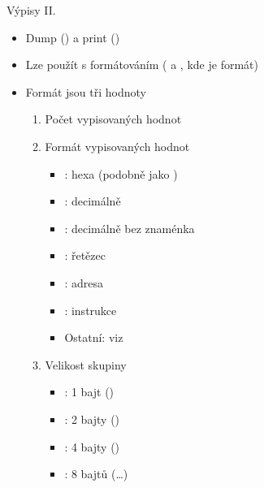 \begin{frame}{Výpisy II.}

  \begin{itemize}
    \item Dump () a print ()
    \item Lze použít s formátováním ( a , kde  je
      formát)

    \pause

    \item Formát jsou tři hodnoty
    \begin{enumerate}
      \item Počet vypisovaných hodnot
      \item Formát vypisovaných hodnot
      \begin{itemize}
	\item {}: hexa (podobně jako )
	\item {}: decimálně
	\item {}: decimálně bez znaménka
	\item {}: řetězec
	\item {}: adresa
	\item {}: instrukce
	\item Ostatní: viz 
      \end{itemize}

      \pause

      \item Velikost skupiny
      \begin{itemize}
	\item {}: 1 bajt ()
	\item {}: 2 bajty ()
	\item {}: 4 bajty ()
	\item {}: 8 bajtů (\dots)
      \end{itemize}
    \end{enumerate}
  \end{itemize}

\end{frame}

